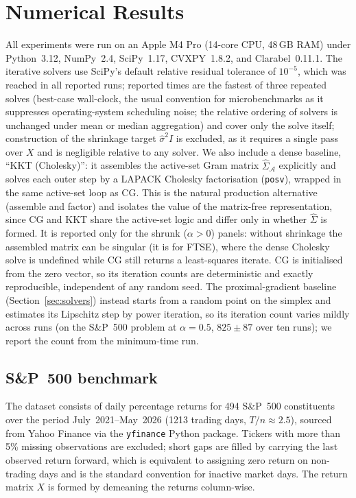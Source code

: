\section{Numerical Results}\label{sec:results}

All experiments were run on an Apple M4 Pro (14-core CPU, 48\,GB RAM) under Python~3.12, NumPy~2.4, SciPy~1.17,
CVXPY~1.8.2, and Clarabel~0.11.1. The iterative solvers use SciPy's default relative residual tolerance of $10^{-5}$,
which was reached in all reported runs; reported times are the fastest of three repeated solves (best-case
wall-clock, the usual convention for microbenchmarks as it suppresses operating-system scheduling noise; the
relative ordering of solvers is unchanged under mean or median aggregation) and cover only the
solve itself; construction of the shrinkage target $\hat\sigma^2 I$ is excluded, as it requires a single pass over
$X$ and is negligible relative to any solver.
We also include a dense baseline, ``KKT (Cholesky)'': it assembles the active-set Gram
matrix $\hat\Sigma_{\mathcal{A}}$ explicitly and solves each outer step by a LAPACK
Cholesky factorisation (\texttt{posv}), wrapped in the same active-set loop as CG. This
is the natural production alternative (assemble and factor) and isolates the value of
the matrix-free representation, since CG and KKT share the active-set logic and differ
only in whether $\hat\Sigma$ is formed. It is reported only for the shrunk ($\alpha>0$)
panels: without shrinkage the assembled matrix can be singular (it is for FTSE), where
the dense Cholesky solve is undefined while CG still returns a least-squares iterate.
CG is initialised from the zero vector, so its iteration counts are deterministic
and exactly reproducible, independent of any random seed. The proximal-gradient baseline (Section~\ref{sec:solvers}) instead starts from a
random point on the simplex and estimates its Lipschitz step by power iteration, so its iteration count varies
mildly across runs (on the S\&P~500 problem at $\alpha=0.5$, $825 \pm 87$ over ten runs); we report the count from
the minimum-time run.


\subsection{S\&P~500 benchmark}

The dataset consists of daily percentage returns for 494 S\&P~500 constituents over the period July~2021--May~2026
(1213 trading days, $T/n \approx 2.5$), sourced from Yahoo Finance via the \texttt{yfinance} Python package.
Tickers with more than 5\% missing observations are excluded; short gaps are filled by carrying the last observed
return forward, which is equivalent to assigning zero return on non-trading days and is the standard convention
for inactive market days.
The return matrix $X$ is formed by demeaning the returns column-wise.

